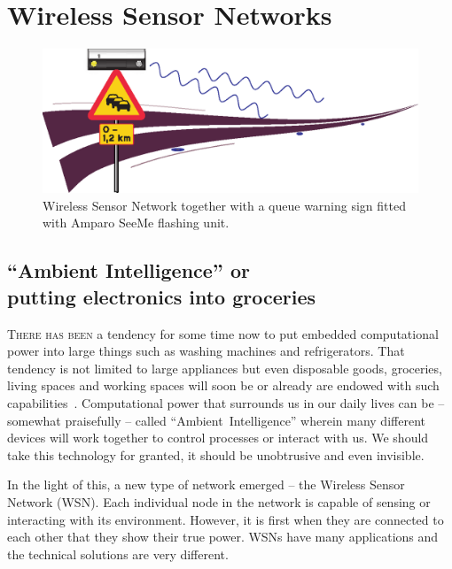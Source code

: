 \cleardoublepage\chapter{Wireless Sensor Networks}\label{chap:network}
\begin{figure}[tbhp]
 \centering
 \includegraphics[width=1\linewidth]{images/queueRoad}
 \caption[Wireless Sensor Network]{Wireless Sensor Network together with a queue warning sign fitted with Amparo SeeMe\mtm{} flashing unit.}
 \label{fig:queueRoad}
\end{figure}

\section[``Ambient Intelligence'' or putting electronics into groceries]{``Ambient Intelligence'' or\\ putting electronics into groceries}
\textsc{There has been} a tendency for some time now to put embedded computational power into large things such as washing machines and refrigerators. That tendency is not limited to large appliances but even disposable goods, groceries, living spaces and working spaces will soon be or already are endowed with such capabilities~\cite{Karl70}. Computational power that surrounds us in our daily lives can be -- somewhat praisefully -- called \mbox{``Ambient Intelligence''} wherein many different devices will work together to control processes or interact with us. We should take this technology for granted, it should be unobtrusive and even invisible.

In the light of this, a new type of network emerged -- the Wireless Sensor Network (WSN). Each individual node in the network is capable of sensing or interacting with its environment. However, it is first when they are connected to each other that they show their true power. WSNs have many applications and the technical solutions are very different. 
 	
